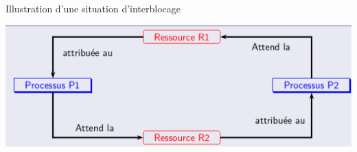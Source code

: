 \documentclass[10pt]{beamer}
\begin{document}
\begin{frame}
	\mframe{\Processus}
	\setlength{\shadowsize}{1pt}
	\begin{block}{Illustration d'une situation d'interblocage}
		\begin{center}	
			\includegraphics[scale=0.25]{../../Archi_Materielle/data/blocage_5}
		\end{center}
	\end{block}
\end{frame}
\end{document}

